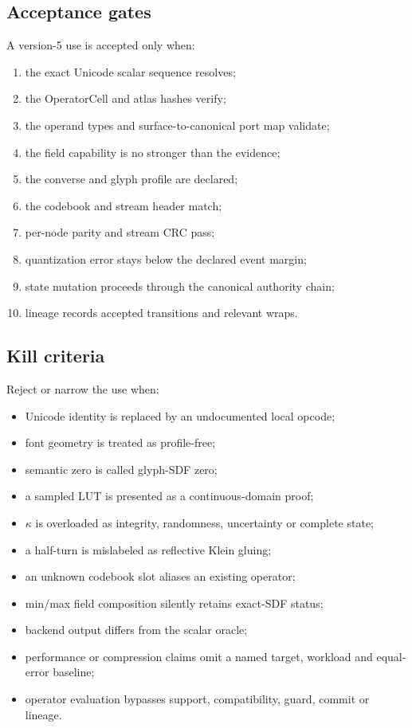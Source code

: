 \documentclass[11pt,a4paper]{article}
\begin{document}
\subsection{Acceptance gates}
A version-5 use is accepted only when:
\begin{enumerate}
\item the exact Unicode scalar sequence resolves;
\item the OperatorCell and atlas hashes verify;
\item the operand types and surface-to-canonical port map validate;
\item the field capability is no stronger than the evidence;
\item the converse and glyph profile are declared;
\item the codebook and stream header match;
\item per-node parity and stream CRC pass;
\item quantization error stays below the declared event margin;
\item state mutation proceeds through the canonical authority chain;
\item lineage records accepted transitions and relevant wraps.
\end{enumerate}

\subsection{Kill criteria}
Reject or narrow the use when:
\begin{itemize}
\item Unicode identity is replaced by an undocumented local opcode;
\item font geometry is treated as profile-free;
\item semantic zero is called glyph-SDF zero;
\item a sampled LUT is presented as a continuous-domain proof;
\item \(\kappa\) is overloaded as integrity, randomness, uncertainty or complete state;
\item a half-turn is mislabeled as reflective Klein gluing;
\item an unknown codebook slot aliases an existing operator;
\item min/max field composition silently retains exact-SDF status;
\item backend output differs from the scalar oracle;
\item performance or compression claims omit a named target, workload and equal-error baseline;
\item operator evaluation bypasses support, compatibility, guard, commit or lineage.
\end{itemize}
\end{document}

